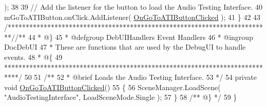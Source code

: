\begin{DoxyCodeInclude}
       );
38 
39         \textcolor{comment}{// Add the listener for the button to load the Audio Testing Interface.}
40         mGoToATIButton.onClick.AddListener( \hyperlink{group___deb_u_i_handlers_ga16e95ec9c2c6cc4cecf06e54e316f00c}{OnGoToATIButtonClicked} );
41     \}
42 
43     \textcolor{comment}{/*************************************************************************/}\textcolor{comment}{/** }
44 \textcolor{comment}{    * @\}}
45 \textcolor{comment}{    * @defgroup DebUIHandlers Event Handlers}
46 \textcolor{comment}{    * @ingroup DocDebUI}
47 \textcolor{comment}{    * These are functions that are used by the DebugUI to handle events.}
48 \textcolor{comment}{    * @\{}
49 \textcolor{comment}{    ****************************************************************************/}
50 \textcolor{comment}{}
51 \textcolor{comment}{    /**}
52 \textcolor{comment}{     * @brief Loads the Audio Testing Interface.}
53 \textcolor{comment}{    */}
54     \textcolor{keyword}{private} \textcolor{keywordtype}{void} \hyperlink{group___deb_u_i_handlers_ga16e95ec9c2c6cc4cecf06e54e316f00c}{OnGoToATIButtonClicked}()
55     \{
56         SceneManager.LoadScene( \textcolor{stringliteral}{"AudioTestingInterface"}, LoadSceneMode.Single );
57     \}\textcolor{comment}{}
58 \textcolor{comment}{    /** @\} */}
59 \}
\end{DoxyCodeInclude}
 